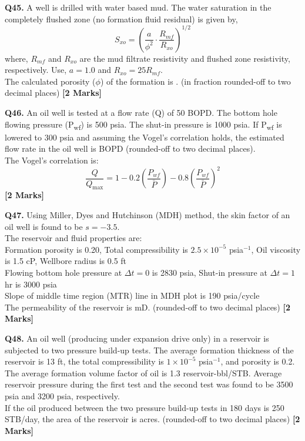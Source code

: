 \documentclass[11pt]{article}
\newcommand{\questionb}[2]{
    \noindent\textbf{Q#2.} #1 \hfill \textbf{[2 Marks]}
}
\begin{document}
\questionb{A well is drilled with water based mud. The water saturation in the completely flushed zone (no formation fluid residual) is given by, \[
S_{xo} = \left( \frac{a}{\phi^2} \cdot \frac{R_{mf}}{R_{xo}} \right)^{1/2}
\] where, \( R_{mf} \) and \( R_{xo} \) are the mud filtrate resistivity and flushed zone resistivity, respectively. Use, \( a = 1.0 \) and \( R_{xo} = 25 R_{mf} \). \\
The calculated porosity (\( \phi \)) of the formation is \underline{\hspace{3cm}}. (in fraction rounded-off to two decimal places)}{45}
\vspace{0.5cm}

\questionb{An oil well is tested at a flow rate (Q) of 50 BOPD. The bottom hole flowing pressure (P\textsubscript{wf}) is 500 psia. The shut-in pressure is 1000 psia. If P\textsubscript{wf} is lowered to 300 psia and assuming the Vogel’s correlation holds, the estimated flow rate in the oil well is \underline{\hspace{3cm}} BOPD (rounded-off to two decimal places). \\
The Vogel’s correlation is: \[
\frac{Q}{Q_{\text{max}}} = 1 - 0.2\left( \frac{P_{wf}}{\bar{P}} \right) - 0.8\left( \frac{P_{wf}}{\bar{P}} \right)^2
\]}{46}
\vspace{0.5cm}

\questionb{Using Miller, Dyes and Hutchinson (MDH) method, the skin factor of an oil well is found to be \( s = -3.5 \). \\
The reservoir and fluid properties are: \\
Formation porosity is 0.20, Total compressibility is \( 2.5 \times 10^{-5} \) psia\(^{-1} \), Oil viscosity is 1.5 cP, Wellbore radius is 0.5 ft \\
Flowing bottom hole pressure at \( \Delta t = 0 \) is 2830 psia, Shut-in pressure at \( \Delta t = 1 \) hr is 3000 psia \\
Slope of middle time region (MTR) line in MDH plot is 190 psia/cycle \\
The permeability of the reservoir is \underline{\hspace{3cm}} mD. (rounded-off to two decimal places)}{47}
\vspace{0.5cm}

\questionb{An oil well (producing under expansion drive only) in a reservoir is subjected to two pressure build-up tests. The average formation thickness of the reservoir is 13 ft, the total compressibility is \( 1 \times 10^{-5} \) psia\(^{-1} \), and porosity is 0.2. The average formation volume factor of oil is 1.3 reservoir-bbl/STB. Average reservoir pressure during the first test and the second test was found to be 3500 psia and 3200 psia, respectively. \\
If the oil produced between the two pressure build-up tests in 180 days is 250 STB/day, the area of the reservoir is \underline{\hspace{3cm}} acres. (rounded-off to two decimal places)}{48}
\vspace{0.5cm}
\end{document}
